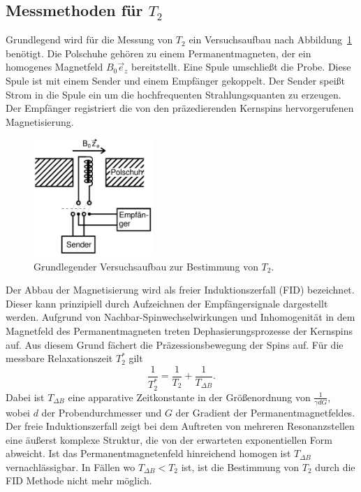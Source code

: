 \subsection{Messmethoden für $T_2$}

Grundlegend wird für die Messung von $T_2$ ein Versuchsaufbau nach
Abbildung~\ref{fig:aufbau} benötigt. Die Polschuhe gehören zu einem
Permanentmagneten, der ein homogenes Magnetfeld $B_0\vec{e}_z$
bereitstellt. Eine Spule umschließt die Probe.
Diese Spule ist mit einem Sender und einem Empfänger gekoppelt.
Der Sender speißt Strom in die Spule ein um die
hochfrequenten Strahlungsquanten zu erzeugen.
Der Empfänger registriert die von den präzedierenden Kernspins
hervorgerufenen Magnetisierung.
\begin{figure}
  \centering
  \includegraphics[width = 0.4\textwidth]{Pics/aufbau.pdf}
  \caption{Grundlegender Versuchsaufbau zur Bestimmung von $T_2$\cite{anleitung}.}
  \label{fig:aufbau}
\end{figure}
Der Abbau der Magnetisierung wird als freier Induktionszerfall (FID)
bezeichnet. Dieser kann prinzipiell durch Aufzeichnen der
Empfängersignale dargestellt werden.
Aufgrund von Nachbar-Spinwechselwirkungen und Inhomogenität in dem Magnetfeld des
Permanentmagneten treten Dephasierungsprozesse der Kernspins auf.
Aus diesem Grund fächert die Präzessionsbewegung der Spins
auf. Für die messbare Relaxationszeit $T^*_2$ gilt
\begin{equation}
  \label{eqn:T^*}
  \frac{1}{T^*_2} = \frac{1}{T_2} + \frac{1}{T_{\Delta B}}.
\end{equation}
Dabei ist $T_{\Delta B}$ eine apparative Zeitkonstante in der
Größenordnung von $\frac{1}{\gamma d G}$, wobei $d$ der Probendurchmesser
und $G$ der Gradient der Permanentmagnetfeldes.
Der freie Induktionszerfall zeigt bei dem Auftreten von mehreren
Resonanzstellen eine äußerst komplexe Struktur, die von der erwarteten
exponentiellen Form abweicht.
Ist das Permanentmagnetenfeld hinreichend homogen ist
$T_{\Delta B}$ vernachlässigbar. In Fällen wo $T_{\Delta B} < T_2$
ist, ist die Bestimmung von $T_2$ durch die FID Methode nicht mehr möglich.

